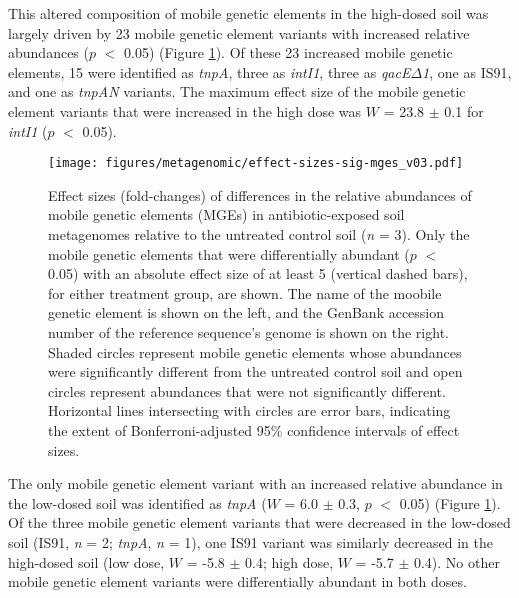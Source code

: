 This altered composition of mobile genetic elements in the high-dosed soil was largely driven by 23 mobile genetic element variants with increased relative abundances ($p$ $<$ 0.05) (Figure \ref{fig:effect-sizes-sig-mges}).
Of these 23 increased mobile genetic elements, 15 were identified as \textit{tnpA}, three as \textit{intI1}, three as \textit{qacE$\Delta$1}, one as IS91, and one as \textit{tnpAN} variants.
The maximum effect size of the mobile genetic element variants that were increased in the high dose was $W$ = 23.8 $\pm$ 0.1 for \textit{intI1} ($p$ $<$ 0.05).

\begin{figure}[htpb]
	\centering
		\texttt{[image: figures/metagenomic/effect-sizes-sig-mges\_v03.pdf]}
	\caption[Effect sizes (fold-changes) of differences in the relative abundances of mobile genetic elements (MGEs) in antibiotic-exposed soil metagenomes relative to the untreated control soil (\textit{n} = 3).]{
		Effect sizes (fold-changes) of differences in the relative abundances of mobile genetic elements (MGEs) in antibiotic-exposed soil metagenomes relative to the untreated control soil (\textit{n} = 3).
		Only the mobile genetic elements that were differentially abundant ($p$ $<$ 0.05) with an absolute effect size of at least 5 (vertical dashed bars), for either treatment group, are shown.
		The name of the moobile genetic element is shown on the left, and the GenBank accession number of the reference sequence's genome is shown on the right.
		Shaded circles represent mobile genetic elements whose abundances were significantly different from the untreated control soil and open circles represent abundances that were not significantly different.
		Horizontal lines intersecting with circles are error bars, indicating the extent of Bonferroni-adjusted 95\% confidence intervals of effect sizes.
	}
	\label{fig:effect-sizes-sig-mges}
\end{figure}

The only mobile genetic element variant with an increased relative abundance in the low-dosed soil was identified as \textit{tnpA} ($W$ = 6.0 $\pm$ 0.3, $p$ $<$ 0.05) (Figure \ref{fig:effect-sizes-sig-mges}).
Of the three mobile genetic element variants that were decreased in the low-dosed soil (IS91, \textit{n} = 2; \textit{tnpA}, \textit{n} = 1), one IS91 variant was similarly decreased in the high-dosed soil (low dose, $W$ = -5.8 $\pm$ 0.4; high dose, $W$ = -5.7 $\pm$ 0.4).
No other mobile genetic element variants were differentially abundant in both doses.

